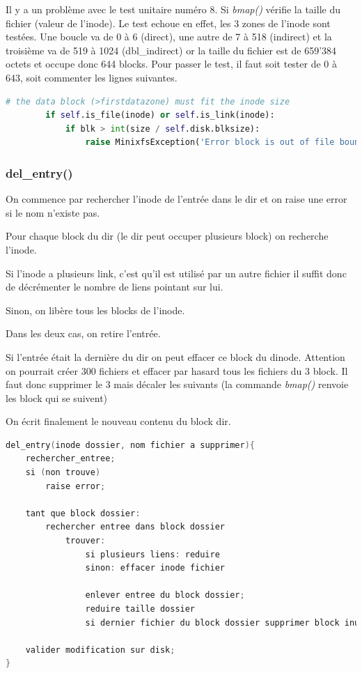 \documentclass[a4paper,12pt]{article}
\begin{document}
Il y a un problème avec le test unitaire numéro 8. Si \emph{bmap()} vérifie la taille du fichier (valeur de l'inode). Le test echoue en effet, les 3 zones de l'inode sont testées. Une boucle va de 0 à 6 (direct), une autre de 7 à 518 (indirect) et la troisième va de 519 à 1024 (dbl\_indirect) or la taille du fichier est de 659'384 octets et occupe donc 644 blocks. Pour passer le test, il faut soit tester de 0 à 643, soit commenter les lignes suivantes.\\


\begin{lstlisting}[language=python, caption=test inode\_size in bmap]
        # the data block (>firstdatazone) must fit the inode size
        if self.is_file(inode) or self.is_link(inode):
            if blk > int(size / self.disk.blksize):
                raise MinixfsException('Error block is out of file boundary')
\end{lstlisting}


\subsubsection*{del\_entry()}

On commence par rechercher l'inode de l'entrée dans le dir et on raise une error si le nom n'existe pas.

Pour chaque block du dir (le dir peut occuper plusieurs block) on recherche l'inode.

Si l'inode a plusieurs link, c'est qu'il est utilisé par un autre fichier il suffit donc de décrémenter le nombre de liens pointant sur lui.

Sinon, on libère tous les blocks de l'inode.

Dans les deux cas, on retire l'entrée.

Si l'entrée était la dernière du dir on peut effacer ce block du dinode. Attention on pourrait créer 300 fichiers et effacer par hasard tous les fichiers du 3 block. Il faut donc supprimer le 3 mais décaler les suivants (la commande \emph{bmap()} renvoie les block qui se suivent)

On écrit finalement le nouveau contenu du block dir.

\begin{lstlisting}[language=C, caption=pseudo code del\_entry()]
del_entry(inode dossier, nom fichier a supprimer){
	rechercher_entree;
	si (non trouve)
		raise error;

	tant que block dossier:
		rechercher entree dans block dossier
			trouver:
				si plusieurs liens: reduire
				sinon: effacer inode fichier
			
				enlever entree du block dossier;
				reduire taille dossier
				si dernier fichier du block dossier supprimer block inutile;
	
	valider modification sur disk;
}
\end{lstlisting}
\end{document}
